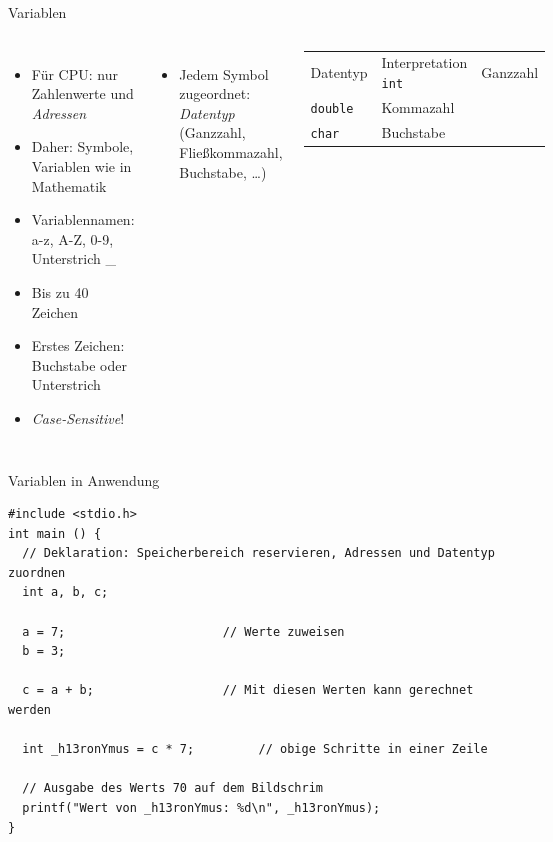 \begin{frame}[fragile]{Variablen}
%
\begin{columns}[T]
\begin{itemize}
	\item Für CPU: nur Zahlenwerte und \emph{Adressen}
	\item Daher: Symbole, Variablen wie in Mathematik
	\item Variablennamen: a-z, A-Z, 0-9, Unterstrich \_
	\item Bis zu 40 Zeichen
	\item Erstes Zeichen: Buchstabe oder Unterstrich
	\item \emph{Case-Sensitive}!
\end{itemize}
%
\begin{itemize}
	\item Jedem Symbol zugeordnet: \emph{Datentyp} (Ganzzahl, Fließkommazahl, Buchstabe, \ldots)
\end{itemize}
%
\begin{tcolorbox}[title=Eine \emph{unvollständige} Liste von Datentypen in C]
	\begin{center}
	\begin{table}
	\begin{tabularx}
		{\linewidth}
		{CC}
		
		Datentyp & Interpretation \tabcrlf
		\texttt{int}    & Ganzzahl \\
		\texttt{double} & Kommazahl \\
		\texttt{char}   & Buchstabe
	\end{tabularx}\newline
	\end{table}
	\end{center}	
\end{tcolorbox}
%
\end{columns}
%
\end{frame}


\begin{frame}[fragile]{Variablen in Anwendung}
%
\begin{codebox}
\begin{verbatim}
#include <stdio.h>
int main () {
  // Deklaration: Speicherbereich reservieren, Adressen und Datentyp zuordnen
  int a, b, c;
  
  a = 7; 	                  // Werte zuweisen
  b = 3;
  
  c = a + b; 	              // Mit diesen Werten kann gerechnet werden
  
  int _h13ronYmus = c * 7;         // obige Schritte in einer Zeile
  
  // Ausgabe des Werts 70 auf dem Bildschrim
  printf("Wert von _h13ronYmus: %d\n", _h13ronYmus);
}
\end{verbatim}
\end{codebox}
%
\end{frame}

